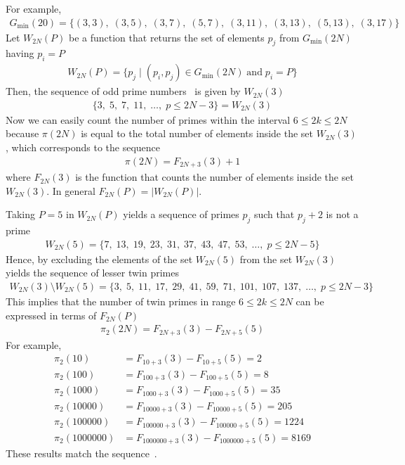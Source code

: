 For example,
\begin{align*}
    G_{\min}(20) = \{
    (3,3),\;
    (3,5),\;
    (3,7),\;
    (5,7),\;
    (3,11),\;
    (3,13),\;
    (5,13),\;
    (3,17)
    \}
\end{align*}
Let $W_{2N}(P)$ be a function that returns the set of elements $p_j$ from $G_{\min} (2N)$ having $p_i=P$
\begin{align*}
    W_{2N}(P) = \{p_j \mid (p_i, p_j) \in G_{\min} (2N) \; \mathrm{and} \; p_i = P \}
\end{align*}
Then, the sequence of odd prime numbers~\cite{oeis:A065091} is given by $W_{2N}(3)$
\begin{align*}
    \{ 3, \; 5, \; 7, \; 11, \; \dots, \; p \leq 2N - 3\} = W_{2N}(3)
\end{align*}
Now we can easily count the number of primes within the interval $6 \leq 2k \leq 2N$ because $\pi(2N)$ is equal to
the total number of elements inside the set $W_{2N}(3)$, which corresponds to the sequence~\cite{oeis_A000720}
\begin{align*}
    \pi(2N) = F_{2N+3}(3) + 1
\end{align*}
where $F_{2N}(3)$ is the function that counts the number of elements inside the set $W_{2N}(3)$.
In general $F_{2N}(P) = |W_{2N}(P)|$.

Taking $P=5$ in $W_{2N}(P)$ yields a sequence of primes $p_j$ such that $p_j+2$ is not a prime~\cite{oeis:A049591}
\begin{align*}
    W_{2N}(5) = \{ 7, \; 13, \; 19, \; 23, \; 31, \; 37, \; 43, \; 47, \; 53, \; \dots, \;  p \leq 2N - 5 \}
\end{align*}
Hence, by excluding the elements of the set $W_{2N}(5)$ from the set $W_{2N}(3)$ yields the sequence of
lesser twin primes~\cite{oeis:A001359}
\begin{align*}
    W_{2N}(3) \setminus W_{2N}(5) = \{ 3, \; 5, \; 11, \; 17, \; 29, \; 41, \; 59, \; 71, \; 101, \; 107, \; 137, \; \dots, \;  p \leq 2N - 3 \}
\end{align*}
This implies that the number of twin primes in range $6 \leq 2k \leq 2N$ can be expressed in terms of $F_{2N}(P)$
\begin{align*}
    \pi_2 (2N) = F_{2N+3}(3) - F_{2N+5}(5)
\end{align*}
For example,
\begin{align*}
    \pi_2 (10) &= F_{10+3}(3) - F_{10+5}(5) = 2 \\
    \pi_2 (100) &= F_{100+3}(3) - F_{100+5}(5) = 8 \\
    \pi_2 (1000) &= F_{1000+3}(3) - F_{1000+5}(5) = 35 \\
    \pi_2 (10000) &= F_{10000+3}(3) - F_{10000+5}(5) = 205 \\
    \pi_2 (100000) &= F_{100000+3}(3) - F_{100000+5}(5) = 1224 \\
    \pi_2 (1000000) &= F_{1000000+3}(3) - F_{1000000+5}(5) = 8169
\end{align*}
These results match the sequence~\cite{oeis_A007508}.

